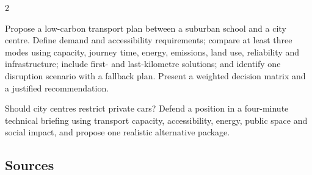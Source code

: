 \begin{multicols}{2}
\begin{engineeringchallenge}
Propose a low-carbon transport plan between a suburban school and a city centre. Define demand and
accessibility requirements; compare at least three modes using capacity, journey time, energy,
emissions, land use, reliability and infrastructure; include first- and last-kilometre solutions;
and identify one disruption scenario with a fallback plan. Present a weighted decision matrix and a
justified recommendation.
\end{engineeringchallenge}

\begin{speaking}
Should city centres restrict private cars? Defend a position in a four-minute technical briefing
using transport capacity, accessibility, energy, public space and social impact, and propose one
realistic alternative package.
\end{speaking}
\end{multicols}

\subsection*{Sources}
